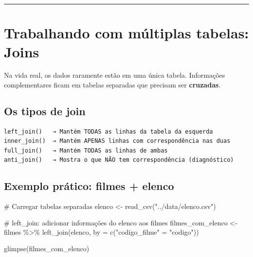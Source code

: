 \documentclass[
  letterpaper,
]{scrbook}
\newenvironment{Shaded}{\begin{snugshade}}{\end{snugshade}}
\newcommand{\AttributeTok}[1]{\textcolor[rgb]{0.40,0.45,0.13}{#1}}
\newcommand{\CommentTok}[1]{\textcolor[rgb]{0.37,0.37,0.37}{#1}}
\newcommand{\FunctionTok}[1]{\textcolor[rgb]{0.28,0.35,0.67}{#1}}
\newcommand{\NormalTok}[1]{\textcolor[rgb]{0.00,0.23,0.31}{#1}}
\newcommand{\OtherTok}[1]{\textcolor[rgb]{0.00,0.23,0.31}{#1}}
\newcommand{\SpecialCharTok}[1]{\textcolor[rgb]{0.37,0.37,0.37}{#1}}
\newcommand{\StringTok}[1]{\textcolor[rgb]{0.13,0.47,0.30}{#1}}
\begin{document}
\begin{center}\rule{0.5\linewidth}{0.5pt}\end{center}

\section{Trabalhando com múltiplas tabelas:
Joins}\label{trabalhando-com-muxfaltiplas-tabelas-joins}

Na vida real, os dados raramente estão em uma única tabela. Informações
complementares ficam em tabelas separadas que precisam ser
\textbf{cruzadas}.

\subsection{Os tipos de join}\label{os-tipos-de-join}

\begin{verbatim}
left_join()   → Mantém TODAS as linhas da tabela da esquerda
inner_join()  → Mantém APENAS linhas com correspondência nas duas
full_join()   → Mantém TODAS as linhas de ambas
anti_join()   → Mostra o que NÃO tem correspondência (diagnóstico)
\end{verbatim}

\subsection{Exemplo prático: filmes +
elenco}\label{exemplo-pruxe1tico-filmes-elenco}

\begin{Shaded}
\begin{Highlighting}[]
\CommentTok{\# Carregar tabelas separadas}
\NormalTok{elenco }\OtherTok{\textless{}{-}} \FunctionTok{read\_csv}\NormalTok{(}\StringTok{"../data/elenco.csv"}\NormalTok{)}

\CommentTok{\# left\_join: adicionar informações do elenco aos filmes}
\NormalTok{filmes\_com\_elenco }\OtherTok{\textless{}{-}}\NormalTok{ filmes }\SpecialCharTok{\%\textgreater{}\%} 
  \FunctionTok{left\_join}\NormalTok{(elenco, }\AttributeTok{by =} \FunctionTok{c}\NormalTok{(}\StringTok{"codigo\_filme"} \OtherTok{=} \StringTok{"codigo"}\NormalTok{))}

\FunctionTok{glimpse}\NormalTok{(filmes\_com\_elenco)}
\end{Highlighting}
\end{Shaded}
\end{document}
